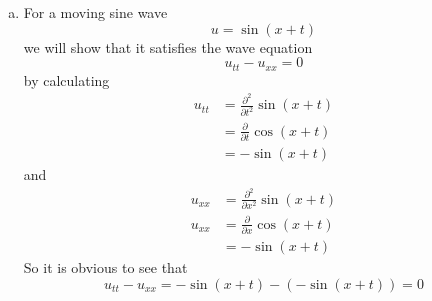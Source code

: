 \documentclass[11pt]{article}
\numberwithin{equation}{section}
\begin{document}
\begin{enumerate}[(a)]
\item
For a moving sine wave
$$u = \sin(x+t)$$
we will show that it satisfies the wave equation
$$u_{tt} - u_{xx} = 0$$
by calculating
\begin{align*}
u_{tt} &= \frac{\partial^2}{\partial t^2}\sin(x+t)\\
&= \frac{\partial}{\partial t}\cos(x+t)\\
&= -\sin(x+t)
\end{align*}
and
\begin{align*}
u_{xx} &= \frac{\partial^2}{\partial x^2}\sin(x+t)\\
u_{xx} &= \frac{\partial}{\partial x}\cos(x+t)\\
&= -\sin(x+t)
\end{align*}
So it is obvious to see that
$$u_{tt} - u_{xx} = -\sin(x+t) - (-\sin(x+t)) = 0$$
\end{enumerate}
\end{document}
